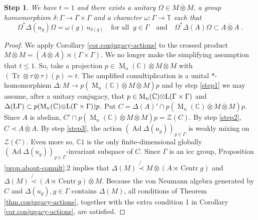 \documentclass[a4paper,11pt]{amsart}
\numberwithin{equation}{section}
\newtheorem{step}{Step}[section]
\begin{document}
\begin{step}\label{step5}
We have $t = 1$ and there exists a unitary $\Omega \in M {\mathbin{\overline{\otimes}}} M$, a group homomorphism $\delta : \Gamma {\rightarrow} \Gamma \times \Gamma$ and a character $\omega : \Gamma {\rightarrow} {\mathbb{T}}$ such that
\begin{equation}\label{eq.adrian}
{\Omega}^* {\Delta}(u_g) {\Omega} = {\omega}(g) \, u_{\delta(g)} \quad\text{for all}\;\; g \in \Gamma \quad\text{and}\quad {\Omega}^* {\Delta}(A) {\Omega} \subset A {\mathbin{\overline{\otimes}}} A \; .
\end{equation}
\end{step}
\begin{proof}
We apply Corollary \ref{cor.conjugacy-actions} to the crossed product $M {\mathbin{\overline{\otimes}}} M = (A {\mathbin{\overline{\otimes}}} A) \rtimes (\Gamma \times \Gamma)$. We no longer make the simplifying assumption that $t {\leqslant} 1$. So, take a projection $p \in {\operatorname{M}}_n({\mathbb{C}}) {\mathbin{\overline{\otimes}}} M {\mathbin{\overline{\otimes}}} M$ with $({\operatorname{Tr}} {\otimes} \tau {\otimes} \tau)(p) = t$. The amplified comultiplication is a unital $*$-homomorphism ${\Delta} : M {\rightarrow} p({\operatorname{M}}_n({\mathbb{C}}) {\mathbin{\overline{\otimes}}} M {\mathbin{\overline{\otimes}}} M)p$ and by step \ref{step1} we may assume, after a unitary conjugacy, that $p \in {\operatorname{M}}_n({\mathbb{C}}) {\otimes} {\mathord{\text{\rm L}}}(\Gamma \times \Gamma)$ and ${\Delta}({\mathord{\text{\rm L}}}\Gamma) \subset p ({\operatorname{M}}_n({\mathbb{C}}) {\otimes} {\mathord{\text{\rm L}}} (\Gamma \times \Gamma))p$. Put $C = {\Delta}(A)' \cap p({\operatorname{M}}_n({\mathbb{C}}) {\mathbin{\overline{\otimes}}} M {\mathbin{\overline{\otimes}}} M)p$. Since $A$ is abelian, $C' \cap p({\operatorname{M}}_n({\mathbb{C}}) {\mathbin{\overline{\otimes}}} M {\mathbin{\overline{\otimes}}} M)p = {\mathcal{Z}}(C)$. By step \ref{step2}, $C {\prec} A {\mathbin{\overline{\otimes}}} A$. By step \ref{step3}, the action $({\operatorname{Ad}} {\Delta}(u_g))_{g \in \Gamma}$ is weakly mixing on ${\mathcal{Z}}(C)$. Even more so, ${\mathbb{C}} 1$ is the only finite-dimensional globally $({\operatorname{Ad}} {\Delta}(u_g))_{g \in \Gamma}$-invariant subspace of $C$. Since $\Gamma$ is an icc group, Proposition \ref{prop.about-comult}.2 implies that ${\Delta}(M) \not{\prec} M {\mathbin{\overline{\otimes}}} (A \rtimes {\operatorname{Centr}} g)$ and ${\Delta}(M) \not{\prec} (A \rtimes {\operatorname{Centr}} g) {\mathbin{\overline{\otimes}}} M$. Because the von Neumann algebra generated by $C$ and ${\Delta}(u_g), g \in \Gamma$ contains ${\Delta}(M)$, all conditions of Theorem \ref{thm.conjugacy-actions}, together with the extra condition 1 in Corollary \ref{cor.conjugacy-actions}, are satisfied.


\end{proof}
\end{document}
